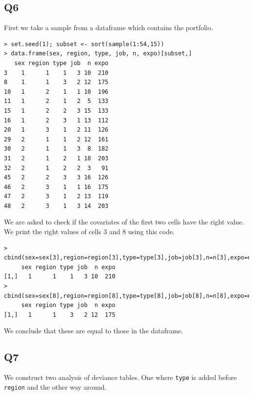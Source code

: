 \documentclass[11pt]{article}
\begin{document}
\subsection*{Q6}

First we take a sample from a dataframe which contains the portfolio.

\begin{verbatim}
> set.seed(1); subset <- sort(sample(1:54,15))
> data.frame(sex, region, type, job, n, expo)[subset,]
   sex region type job  n expo
3    1      1    1   3 10  210
8    1      1    3   2 12  175
10   1      2    1   1 10  196
11   1      2    1   2  5  133
15   1      2    2   3 15  133
16   1      2    3   1 13  112
20   1      3    1   2 11  126
29   2      1    1   2 12  161
30   2      1    1   3  8  182
31   2      1    2   1 18  203
32   2      1    2   2  3   91
45   2      2    3   3 16  126
46   2      3    1   1 16  175
47   2      3    1   2 13  119
48   2      3    1   3 14  203
\end{verbatim}

We are asked to check if the covariates of the first two cells have the right value. We print the right values of cells 3 and 8 using this code.

\begin{verbatim}
> cbind(sex=sex[3],region=region[3],type=type[3],job=job[3],n=n[3],expo=expo[3])
     sex region type job  n expo
[1,]   1      1    1   3 10  210
> cbind(sex=sex[8],region=region[8],type=type[8],job=job[8],n=n[8],expo=expo[8])
     sex region type job  n expo
[1,]   1      1    3   2 12  175
\end{verbatim}

We conclude that these are equal to those in the dataframe.

\subsection*{Q7}

We construct two analysis of deviance tables. One where \verb|type| is added before \verb|region| and the other way around.
\end{document}
